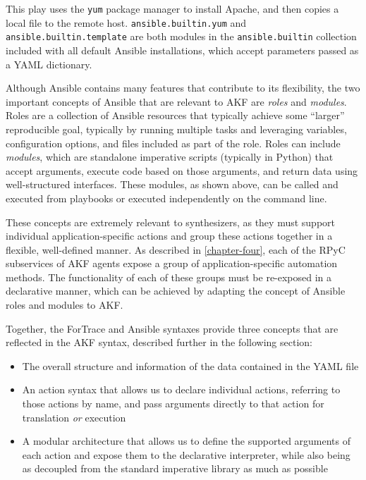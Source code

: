 \documentclass[letterpaper,12pt]{report}
\def\tightlist{}
\newcommand{\passthrough}[1]{#1}
\begin{document}
This play uses the \passthrough{\lstinline!yum!} package manager to
install Apache, and then copies a local file to the remote host.
\passthrough{\lstinline!ansible.builtin.yum!} and
\passthrough{\lstinline!ansible.builtin.template!} are both modules in
the \passthrough{\lstinline!ansible.builtin!} collection included with
all default Ansible installations, which accept parameters passed as a
YAML dictionary.

Although Ansible contains many features that contribute to its
flexibility, the two important concepts of Ansible that are relevant to
AKF are \emph{roles} and \emph{modules}. Roles are a collection of
Ansible resources that typically achieve some ``larger'' reproducible
goal, typically by running multiple tasks and leveraging variables,
configuration options, and files included as part of the role. Roles can
include \emph{modules}, which are standalone imperative scripts
(typically in Python) that accept arguments, execute code based on those
arguments, and return data using well-structured interfaces. These
modules, as shown above, can be called and executed from playbooks or
executed independently on the command line.

These concepts are extremely relevant to synthesizers, as they must
support individual application-specific actions and group these actions
together in a flexible, well-defined manner. As described in
\autoref{chapter-four}, each of the RPyC subservices of AKF
agents expose a group of application-specific automation methods. The
functionality of each of these groups must be re-exposed in a
declarative manner, which can be achieved by adapting the concept of
Ansible roles and modules to AKF.

Together, the ForTrace and Ansible syntaxes provide three concepts that
are reflected in the AKF syntax, described further in the following
section:

\begin{itemize}
\tightlist
\item
  The overall structure and information of the data contained in the
  YAML file
\item
  An action syntax that allows us to declare individual actions,
  referring to those actions by name, and pass arguments directly to
  that action for translation \emph{or} execution
\item
  A modular architecture that allows us to define the supported
  arguments of each action and expose them to the declarative
  interpreter, while also being as decoupled from the standard
  imperative library as much as possible
\end{itemize}
\end{document}

